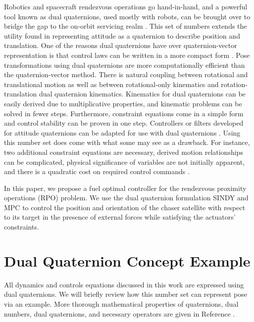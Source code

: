 \documentclass[letterpaper, preprint, paper,11pt]{AAS}	%
\begin{document}
Robotics and spacecraft rendezvous operations go hand-in-hand, and a powerful tool known as dual quaternions, used mostly with robots, can be brought over to bridge the gap to the on-orbit servicing realm \cite{TsiotrasValverde_DualQTool}. This set of numbers extends the utility found in representing attitude as a quaternion to describe position and translation. One of the reasons dual quaternions have over quaternion-vector representation is that control laws can be written in a more compact form \cite{FilipeKontitsis_ExtendedKalmanFilterDualQ}. Pose transformations using dual quaternions are more computationally efficient than the quaternion-vector method. There is natural coupling between rotational and translational motion as well as between rotational-only kinematics and rotation-translation dual quaternion kinematics. Kinematics for dual quaternions can be easily derived due to multiplicative properties, and kinematic problems can be solved in fewer steps. Furthermore, constraint equations come in a simple form and control stability can be proven in one step. Controllers or filters developed for attitude quaternions can be adapted for use with dual quaternions \cite{FilipeTsiotras_AdaptiveDualQ, ValverdeTsiotras_SCRobotDualQ, DooleyMcCarthy_SpatialRBDDualQ}. Using this number set does come with what some may see as a drawback. For instance, two additional constraint equations are necessary, derived motion relationships can be complicated, physical significance of variables are not initially apparent, and there is a quadratic cost on required control commands \cite{DooleyMcCarthy_SpatialRBDDualQ, ReynoldsSzmuk_DualQDescent,LeeMesbahi_ConstrainedMPCDualQ}.

In this paper, we propose a fuel optimal controller for the rendezvous proximity operations (RPO) problem. We use the dual quaternion formulation SINDY and MPC to control the position and orientation of the chaser satellite with respect to its target in the presence of external forces while satisfying the actuators' constraints. 

\section{Dual Quaternion Concept Example}
All dynamics and controls equations discussed in this work are expressed using dual quaternions. We will briefly review how this number set can represent pose via an example. More thorough mathematical properties of quaternions, dual numbers, dual quaternions, and necessary operators are given in Reference . 
\end{document}

